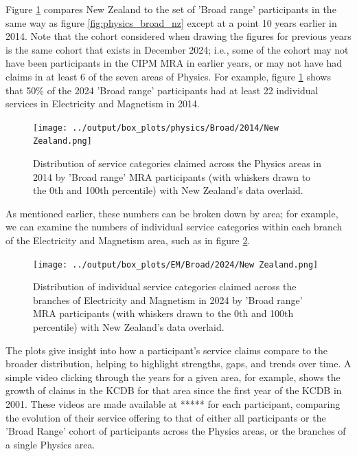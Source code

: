\documentclass[
	a4paper, %
	10pt, %
	unnumberedsections, %
	twoside, %
]{LTJournalArticle}
\begin{document}
Figure \ref{fig:physics_broad_nz_2014} compares New Zealand to the set of 'Broad range' participants in the same way as figure \ref{fig:physics_broad_nz} except at a point 10 years earlier in 2014. Note that the cohort considered when drawing the figures for previous years is the same cohort that exists in December 2024; i.e., some of the cohort may not have been participants in the CIPM MRA in earlier years, or may not have had claims in at least 6 of the seven areas of Physics. For example, figure \ref{fig:physics_broad_nz_2014} shows that 50\% of the 2024 'Broad range' participants had at least 22 individual services in Electricity and Magnetism in 2014.

\begin{figure}[!htpb]
    \centering
    \texttt{[image: ../output/box\_plots/physics/Broad/2014/New Zealand.png]}
    \caption{Distribution of service categories claimed across the Physics areas in 2014 by 'Broad range' MRA participants (with whiskers drawn to the 0th and 100th percentile) with New Zealand's data overlaid.}
    \label{fig:physics_broad_nz_2014}
\end{figure}

As mentioned earlier, these numbers can be broken down by area; for example, we can examine the numbers of individual service categories within each branch of the Electricity and Magnetism area, such as in figure \ref{fig:EM_broad_nz}.

\begin{figure}[!htpb]
    \centering
    \texttt{[image: ../output/box\_plots/EM/Broad/2024/New Zealand.png]}
    \caption{Distribution of individual service categories claimed across the branches of Electricity and Magnetism in 2024 by 'Broad range' MRA participants (with whiskers drawn to the 0th and 100th percentile) with New Zealand's data overlaid.}
    \label{fig:EM_broad_nz}
\end{figure}

The plots give insight into how a participant’s service claims compare to the broader distribution, helping to highlight strengths, gaps, and trends over time. A simple video clicking through the years for a given area, for example, shows the growth of claims in the KCDB for that area since the first year of the KCDB in 2001. These videos are made available at ***** for each participant, comparing the evolution of their service offering to that of either all participants or the 'Broad Range' cohort of participants across the Physics areas, or the branches of a single Physics area.
\end{document}
